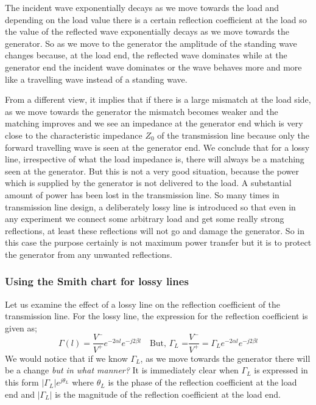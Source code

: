 The incident wave exponentially decays as we move towards the load and depending on the load value there is a certain reflection coefficient at the load so the value of the reflected wave exponentially decays as we move towards the generator. So as we move to the generator the amplitude of the standing wave changes because, at the load end, the reflected wave dominates while at the generator end the incident wave dominates or the wave behaves more and more like a travelling wave instead of a standing wave.

From a different view, it implies that if there is a large mismatch at the load side, as we move towards the generator the mismatch becomes weaker and the matching improves and we see an impedance at the generator end which is very close to the characteristic impedance $Z_0$ of the transmission line because only the forward travelling wave is seen at the generator end. We conclude that for a lossy line, irrespective of what the load impedance is, there will always be a matching seen at the generator. But this is not a very good situation, because the power which is supplied by the generator is not delivered to the load. A substantial amount of power has been lost in the transmission line. So many times in transmission line design, a deliberately lossy line is introduced so that even in any experiment we connect some arbitrary load and get some really strong reflections, at least these reflections will not go and damage the generator. So in this case the purpose certainly is not maximum power transfer but it is to protect the generator from any unwanted reflections.

\subsubsection{Using the Smith chart for lossy lines}
Let us examine the effect of a lossy line on the reflection coefficient of the transmission line. For the lossy line, the expression for the reflection coefficient is given as;
\begin{dmath*}
\Gamma{(l)} = \frac{V^-}{V^+}e^{-2\alpha l}e^{-j2\beta l}\quad\text{But, }\Gamma_L\text{ =}\frac{V^-}{V^+}
= \Gamma_Le^{-2\alpha l}e^{-j2\beta l}
\end{dmath*}
We would notice that if we know $\Gamma_L$, as we move towards the generator there will be a change \emph{but in what manner?} It is immediately clear when $\Gamma_L$ is expressed in this form $|\Gamma_L |e^{j\theta_L}$ where $\theta_L$ is the phase of the reflection coefficient at the load end and $|\Gamma_L|$ is the magnitude of the reflection coefficient at the load end.

